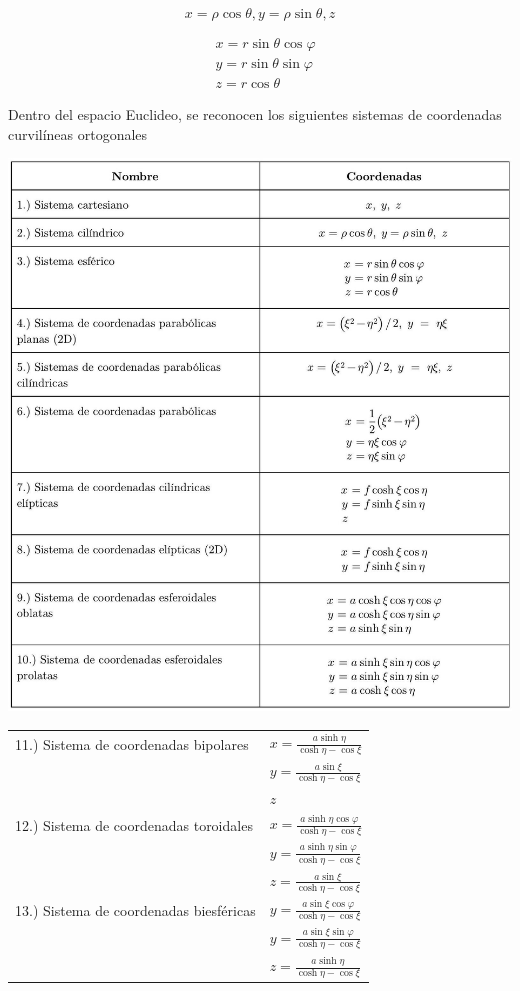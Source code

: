 $$
x=\rho \cos \theta, y=\rho \sin \theta, z
$$

$$
\begin{aligned}
& x=r \sin \theta \cos \varphi \\
& y=r \sin \theta \sin \varphi \\
& z=r \cos \theta
\end{aligned}
$$

Dentro del espacio Euclideo, se reconocen los siguientes sistemas de coordenadas curvilíneas ortogonales

\begin{center}
\includegraphics[max width=\textwidth]{tabla_sistemas_coordenados.jpg}
\end{center}

\begin{center}
\begin{tabular}{|l|l|}
\hline
11.) Sistema de coordenadas bipolares & $x=\frac{a \sinh \eta}{\cosh \eta-\cos \xi}$ \\
 & $y=\frac{a \sin \xi}{\cosh \eta-\cos \xi}$ \\
 & $z$ \\
\hline
12.) Sistema de coordenadas toroidales & $x=\frac{a \sinh \eta \cos \varphi}{\cosh \eta-\cos \xi}$ \\
 & $y=\frac{a \sinh \eta \sin \varphi}{\cosh \eta-\cos \xi}$ \\
 & $z=\frac{a \sin \xi}{\cosh \eta-\cos \xi}$ \\
\hline
13.) Sistema de coordenadas biesféricas & $y=\frac{a \sin \xi \cos \varphi}{\cosh \eta-\cos \xi}$ \\
 & $y=\frac{a \sin \xi \sin \varphi}{\cosh \eta-\cos \xi}$ \\
 & $z=\frac{a \sinh \eta}{\cosh \eta-\cos \xi}$ \\
\hline
\end{tabular}
\end{center}

